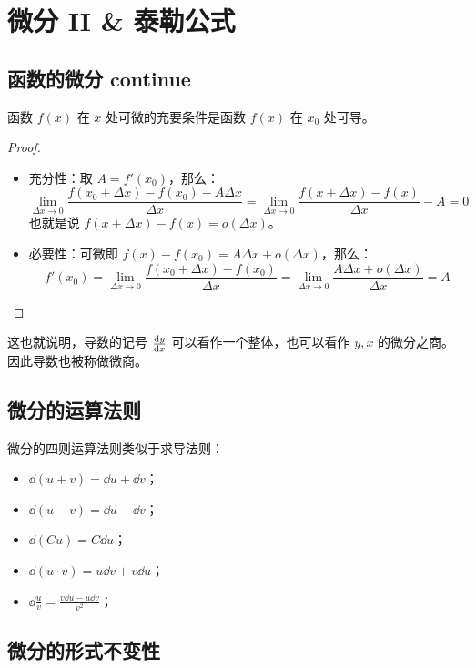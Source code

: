 \section{微分 II \& 泰勒公式}

\subsection{函数的微分 continue}

\begin{theorem}
	函数 $f(x)$ 在 $x$ 处可微的充要条件是函数 $f(x)$ 在 $x_0$ 处可导。

	\begin{proof}
		\begin{itemize}
			\item 充分性：取 $A = f'(x_0)$，那么：
			$$
			\lim_{\Delta x \to 0} \frac{f(x_0 + \Delta x) - f(x_0) - A \Delta x}{\Delta x} = \lim_{\Delta x \to 0} \frac{f(x + \Delta x) - f(x)}{\Delta x} - A = 0
			$$
			也就是说 $f(x + \Delta x) - f(x) = o(\Delta x)$。

			\item 必要性：可微即 $f(x) - f(x_0) = A \Delta x + o(\Delta x)$，那么：
			$$
			f'(x_0) = \lim_{\Delta x \to 0} \frac{f(x_0 + \Delta x) - f(x_0)}{\Delta x} = \lim_{\Delta x \to 0} \frac{A \Delta x + o(\Delta x)}{\Delta x} = A
			$$
		\end{itemize}
	\end{proof}
\end{theorem}

这也就说明，导数的记号 $\dv{y}{x}$ 可以看作一个整体，也可以看作 $y, x$ 的微分之商。因此导数也被称做微商。

\subsection{微分的运算法则}

微分的四则运算法则类似于求导法则：

\begin{itemize}
	\item $\dd (u + v) = \dd u + \dd v$；
	\item $\dd (u - v) = \dd u - \dd v$；
	\item $\dd (C u) = C \dd u$；
	\item $\dd (u \cdot v) = u \dd v + v \dd u$；
	\item $\dd \frac{u}{v} = \frac{v \dd u - u \dd v}{v^2}$；
\end{itemize}

\subsection{微分的形式不变性}

